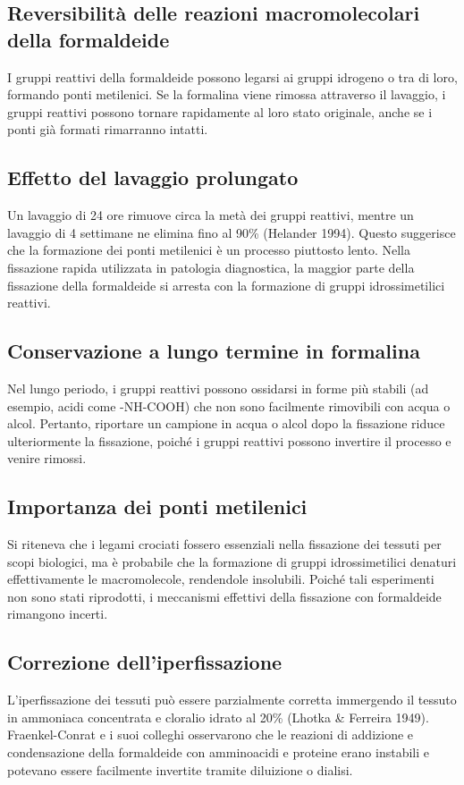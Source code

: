 \subsection{Reversibilità delle reazioni macromolecolari della formaldeide}
I gruppi reattivi della formaldeide possono legarsi ai gruppi idrogeno o tra di loro, formando ponti metilenici. Se la formalina viene rimossa attraverso il lavaggio, i gruppi reattivi possono tornare rapidamente al loro stato originale, anche se i ponti già formati rimarranno intatti.

\subsection{Effetto del lavaggio prolungato}
Un lavaggio di 24 ore rimuove circa la metà dei gruppi reattivi, mentre un lavaggio di 4 settimane ne elimina fino al 90\% (Helander 1994). Questo suggerisce che la formazione dei ponti metilenici è un processo piuttosto lento. Nella fissazione rapida utilizzata in patologia diagnostica, la maggior parte della fissazione della formaldeide si arresta con la formazione di gruppi idrossimetilici reattivi.

\subsection{Conservazione a lungo termine in formalina}
Nel lungo periodo, i gruppi reattivi possono ossidarsi in forme più stabili (ad esempio, acidi come -NH-COOH) che non sono facilmente rimovibili con acqua o alcol. Pertanto, riportare un campione in acqua o alcol dopo la fissazione riduce ulteriormente la fissazione, poiché i gruppi reattivi possono invertire il processo e venire rimossi.

\subsection{Importanza dei ponti metilenici}
Si riteneva che i legami crociati fossero essenziali nella fissazione dei tessuti per scopi biologici, ma è probabile che la formazione di gruppi idrossimetilici denaturi effettivamente le macromolecole, rendendole insolubili. Poiché tali esperimenti non sono stati riprodotti, i meccanismi effettivi della fissazione con formaldeide rimangono incerti.

\subsection{Correzione dell'iperfissazione}
L'iperfissazione dei tessuti può essere parzialmente corretta immergendo il tessuto in ammoniaca concentrata e cloralio idrato al 20\% (Lhotka \& Ferreira 1949). Fraenkel-Conrat e i suoi colleghi osservarono che le reazioni di addizione e condensazione della formaldeide con amminoacidi e proteine erano instabili e potevano essere facilmente invertite tramite diluizione o dialisi.

